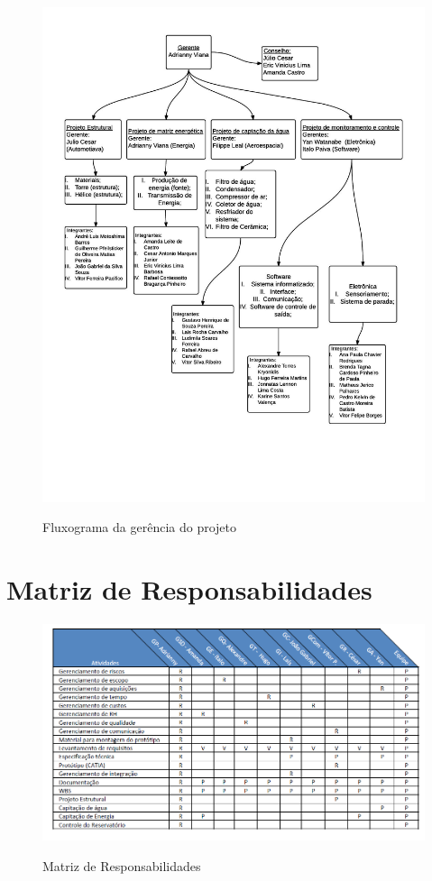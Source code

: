 \FloatBarrier
\begin{figure}[!h]
      \centering
      \includegraphics[scale = 0.27]{editaveis/figuras/Fluxograma_gerencia}
      \label{fluxograma_gerencia_projeto}
      \caption{Fluxograma da gerência do projeto}
    \end{figure}
    \FloatBarrier

 \section*{Matriz de Responsabilidades}
 \FloatBarrier
 \begin{figure}[h]
\includegraphics[scale=0.65]{editaveis/figuras/matriz}
\label{matrizderesponsabilidades}
\caption{Matriz de Responsabilidades}
 \end{figure}

